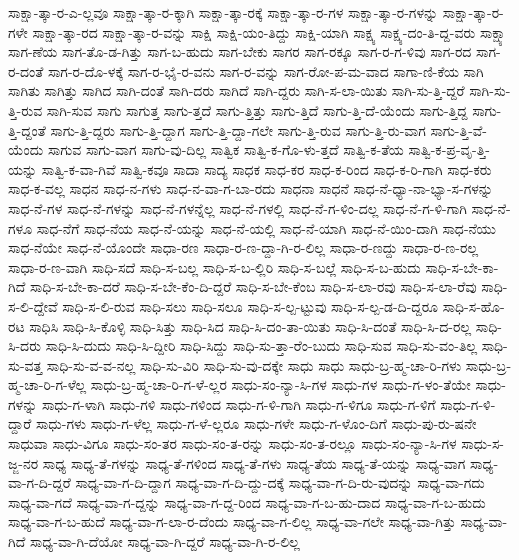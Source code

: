 {ಸಾಕ್ಷಾ-ತ್ಕಾ-ರ-ಎ-ಲ್ಲವೂ
ಸಾಕ್ಷಾ-ತ್ಕಾ-ರ-ಕ್ಕಾಗಿ
ಸಾಕ್ಷಾ-ತ್ಕಾ-ರಕ್ಕೆ
ಸಾಕ್ಷಾ-ತ್ಕಾ-ರ-ಗಳ
ಸಾಕ್ಷಾ-ತ್ಕಾ-ರ-ಗಳನ್ನು
ಸಾಕ್ಷಾ-ತ್ಕಾ-ರ-ಗಳೇ
ಸಾಕ್ಷಾ-ತ್ಕಾ-ರದ
ಸಾಕ್ಷಾ-ತ್ಕಾ-ರ-ವನ್ನು
ಸಾಕ್ಷಿ
ಸಾಕ್ಷಿ-ಯಂ-ತಿದ್ದು
ಸಾಕ್ಷಿ-ಯಾಗಿ
ಸಾಕ್ಷ್ಯ
ಸಾಕ್ಷ್ಯ-ದಂ-ತಿ-ದ್ದ-ವರು
ಸಾಕ್ಷ್ಯಾ
ಸಾಗ-ಣೆಯ
ಸಾಗ-ತೊ-ಡ-ಗಿತ್ತು
ಸಾಗ-ಬ-ಹುದು
ಸಾಗ-ಬೇಕು
ಸಾಗರ
ಸಾಗ-ರಕ್ಕೂ
ಸಾಗ-ರ-ಗ-ಳಿವು
ಸಾಗ-ರದ
ಸಾಗ-ರ-ದಂತೆ
ಸಾಗ-ರ-ದೊ-ಳಕ್ಕೆ
ಸಾಗ-ರ-ಭೈ-ರ-ವನು
ಸಾಗ-ರ-ವನ್ನು
ಸಾಗ-ರೋ-ಪ-ಮ-ವಾದ
ಸಾಗಾ-ಣಿ-ಕೆಯ
ಸಾಗಿ
ಸಾಗಿತು
ಸಾಗಿತ್ತು
ಸಾಗಿದ
ಸಾಗಿ-ದಂತೆ
ಸಾಗಿ-ದರು
ಸಾಗಿದೆ
ಸಾಗಿ-ದ್ದರು
ಸಾಗಿ-ಸ-ಲಾ-ಯಿತು
ಸಾಗಿ-ಸು-ತ್ತಿ-ದ್ದರೆ
ಸಾಗಿ-ಸು-ತ್ತಿ-ರುವ
ಸಾಗಿ-ಸುವ
ಸಾಗು
ಸಾಗುತ್ತ
ಸಾಗು-ತ್ತದೆ
ಸಾಗು-ತ್ತಿತ್ತು
ಸಾಗು-ತ್ತಿದೆ
ಸಾಗು-ತ್ತಿ-ದೆ-ಯೆಂದು
ಸಾಗು-ತ್ತಿದ್ದ
ಸಾಗು-ತ್ತಿ-ದ್ದಂತೆ
ಸಾಗು-ತ್ತಿ-ದ್ದರು
ಸಾಗು-ತ್ತಿ-ದ್ದಾಗ
ಸಾಗು-ತ್ತಿ-ದ್ದಾ-ಗಲೇ
ಸಾಗು-ತ್ತಿ-ರುವ
ಸಾಗು-ತ್ತಿ-ರು-ವಾಗ
ಸಾಗು-ತ್ತಿ-ವೆ-ಯೆಂದು
ಸಾಗುವ
ಸಾಗು-ವಾಗ
ಸಾಗು-ವು-ದಿಲ್ಲ
ಸಾತ್ವಿಕ
ಸಾತ್ವಿ-ಕ-ಗೊ-ಳು-ತ್ತದೆ
ಸಾತ್ವಿ-ಕ-ತೆಯ
ಸಾತ್ವಿ-ಕ-ಪ್ರ-ವೃ-ತ್ತಿ-ಯನ್ನು
ಸಾತ್ವಿ-ಕ-ವಾ-ಗಿವೆ
ಸಾತ್ವಿ-ಕವೂ
ಸಾದಾ
ಸಾದ್ಯ
ಸಾಧಕ
ಸಾಧ-ಕರ
ಸಾಧ-ಕ-ರಿಂದ
ಸಾಧ-ಕ-ರಿ-ಗಾಗಿ
ಸಾಧ-ಕರು
ಸಾಧ-ಕ-ವಲ್ಲ
ಸಾಧನ
ಸಾಧ-ನ-ಗಳು
ಸಾಧ-ನ-ವಾ-ಗ-ಬಾ-ರದು
ಸಾಧನಾ
ಸಾಧನೆ
ಸಾಧ-ನೆ-ಧ್ಯಾ-ನಾ-ಭ್ಯಾ-ಸ-ಗಳನ್ನು
ಸಾಧ-ನೆ-ಗಳ
ಸಾಧ-ನೆ-ಗಳನ್ನು
ಸಾಧ-ನೆ-ಗಳನ್ನೆಲ್ಲ
ಸಾಧ-ನೆ-ಗಳಲ್ಲಿ
ಸಾಧ-ನೆ-ಗ-ಳಿಂ-ದಲ್ಲ
ಸಾಧ-ನೆ-ಗ-ಳಿ-ಗಾಗಿ
ಸಾಧ-ನೆ-ಗಳೂ
ಸಾಧ-ನೆಗೆ
ಸಾಧ-ನೆಯ
ಸಾಧ-ನೆ-ಯನ್ನು
ಸಾಧ-ನೆ-ಯಲ್ಲಿ
ಸಾಧ-ನೆ-ಯಾಗಿ
ಸಾಧ-ನೆ-ಯಿಂ-ದಾಗಿ
ಸಾಧ-ನೆಯು
ಸಾಧ-ನೆಯೇ
ಸಾಧ-ನೆ-ಯೊಂದೇ
ಸಾಧಾ-ರಣ
ಸಾಧಾ-ರ-ಣ-ದ್ದಾ-ಗಿ-ರ-ಲಿಲ್ಲ
ಸಾಧಾ-ರ-ಣದ್ದು
ಸಾಧಾ-ರ-ಣ-ರಲ್ಲ
ಸಾಧಾ-ರ-ಣ-ವಾಗಿ
ಸಾಧಿ-ಸದೆ
ಸಾಧಿ-ಸ-ಬಲ್ಲ
ಸಾಧಿ-ಸ-ಬ-ಲ್ಲಿರಿ
ಸಾಧಿ-ಸ-ಬಲ್ಲೆ
ಸಾಧಿ-ಸ-ಬ-ಹುದು
ಸಾಧಿ-ಸ-ಬೇ-ಕಾ-ಗಿದೆ
ಸಾಧಿ-ಸ-ಬೇ-ಕಾ-ದರೆ
ಸಾಧಿ-ಸ-ಬೇ-ಕೆಂ-ದಿ-ದ್ದರೆ
ಸಾಧಿ-ಸ-ಬೇ-ಕೆಂಬ
ಸಾಧಿ-ಸ-ಲಾ-ರವು
ಸಾಧಿ-ಸ-ಲಾ-ರೆವು
ಸಾಧಿ-ಸ-ಲಿ-ದ್ದೇವೆ
ಸಾಧಿ-ಸ-ಲಿ-ರುವ
ಸಾಧಿ-ಸಲು
ಸಾಧಿ-ಸಲೂ
ಸಾಧಿ-ಸ-ಲ್ಪ-ಟ್ಟುವು
ಸಾಧಿ-ಸ-ಲ್ಪ-ಡ-ದಿ-ದ್ದರೂ
ಸಾಧಿ-ಸ-ಹೊ-ರಟ
ಸಾಧಿಸಿ
ಸಾಧಿ-ಸಿ-ಕೊಳ್ಳಿ
ಸಾಧಿ-ಸಿತ್ತು
ಸಾಧಿ-ಸಿದ
ಸಾಧಿ-ಸಿ-ದಂ-ತಾ-ಯಿತು
ಸಾಧಿ-ಸಿ-ದಂತೆ
ಸಾಧಿ-ಸಿ-ದ-ರಲ್ಲ
ಸಾಧಿ-ಸಿ-ದರು
ಸಾಧಿ-ಸಿ-ದುದು
ಸಾಧಿ-ಸಿ-ದ್ದೀರಿ
ಸಾಧಿ-ಸಿದ್ದು
ಸಾಧಿ-ಸು-ತ್ತಾ-ರೆಂ-ಬುದು
ಸಾಧಿ-ಸುವ
ಸಾಧಿ-ಸು-ವಂ-ತಿಲ್ಲ
ಸಾಧಿ-ಸು-ವತ್ತ
ಸಾಧಿ-ಸು-ವ-ವ-ನಲ್ಲ
ಸಾಧಿ-ಸು-ವಿರಿ
ಸಾಧಿ-ಸು-ವು-ದಕ್ಕೇ
ಸಾಧು
ಸಾಧು
ಸಾಧು-ಬ್ರ-ಹ್ಮ-ಚಾ-ರಿ-ಗಳು
ಸಾಧು-ಬ್ರ-ಹ್ಮ-ಚಾ-ರಿ-ಗ-ಳೆಲ್ಲ
ಸಾಧು-ಬ್ರ-ಹ್ಮ-ಚಾ-ರಿ-ಗ-ಳೆ-ಲ್ಲರ
ಸಾಧು-ಸಂ-ನ್ಯಾ-ಸಿ-ಗಳ
ಸಾಧು-ಗಳ
ಸಾಧು-ಗ-ಳಂ-ತೆಯೇ
ಸಾಧು-ಗಳನ್ನು
ಸಾಧು-ಗ-ಳಾಗಿ
ಸಾಧು-ಗಳಿ
ಸಾಧು-ಗಳಿಂದ
ಸಾಧು-ಗ-ಳಿ-ಗಾಗಿ
ಸಾಧು-ಗ-ಳಿಗೂ
ಸಾಧು-ಗ-ಳಿಗೆ
ಸಾಧು-ಗ-ಳಿ-ದ್ದಾರೆ
ಸಾಧು-ಗಳು
ಸಾಧು-ಗ-ಳೆಲ್ಲ
ಸಾಧು-ಗ-ಳೆ-ಲ್ಲರೂ
ಸಾಧು-ಗಳೇ
ಸಾಧು-ಗ-ಳೊಂ-ದಿಗೆ
ಸಾಧು-ಪು-ರು-ಷನೇ
ಸಾಧುವಾ
ಸಾಧು-ವಿಗೂ
ಸಾಧು-ಸಂ-ತರ
ಸಾಧು-ಸಂ-ತ-ರನ್ನು
ಸಾಧು-ಸಂ-ತ-ರಲ್ಲೂ
ಸಾಧು-ಸಂ-ನ್ಯಾ-ಸಿ-ಗಳ
ಸಾಧು-ಸ-ಜ್ಜ-ನರ
ಸಾಧ್ಯ
ಸಾಧ್ಯ-ತೆ-ಗಳನ್ನು
ಸಾಧ್ಯ-ತೆ-ಗಳಿಂದ
ಸಾಧ್ಯ-ತೆ-ಗಳು
ಸಾಧ್ಯ-ತೆಯ
ಸಾಧ್ಯ-ತೆ-ಯನ್ನು
ಸಾಧ್ಯ-ವಾಗ
ಸಾಧ್ಯ-ವಾ-ಗ-ದಿ-ದ್ದರೆ
ಸಾಧ್ಯ-ವಾ-ಗ-ದಿ-ದ್ದಾಗ
ಸಾಧ್ಯ-ವಾ-ಗ-ದಿ-ದ್ದು-ದಕ್ಕೆ
ಸಾಧ್ಯ-ವಾ-ಗ-ದಿ-ರು-ವುದನ್ನು
ಸಾಧ್ಯ-ವಾ-ಗದು
ಸಾಧ್ಯ-ವಾ-ಗದೆ
ಸಾಧ್ಯ-ವಾ-ಗ-ದ್ದನ್ನು
ಸಾಧ್ಯ-ವಾ-ಗ-ದ್ದ-ರಿಂದ
ಸಾಧ್ಯ-ವಾ-ಗ-ಬ-ಹು-ದಾದ
ಸಾಧ್ಯ-ವಾ-ಗ-ಬ-ಹುದು
ಸಾಧ್ಯ-ವಾ-ಗ-ಬ-ಹುದೆ
ಸಾಧ್ಯ-ವಾ-ಗ-ಲಾ-ರ-ದೆಂದು
ಸಾಧ್ಯ-ವಾ-ಗ-ಲಿಲ್ಲ
ಸಾಧ್ಯ-ವಾ-ಗಲೇ
ಸಾಧ್ಯ-ವಾ-ಗಿತ್ತು
ಸಾಧ್ಯ-ವಾ-ಗಿದೆ
ಸಾಧ್ಯ-ವಾ-ಗಿ-ದೆಯೋ
ಸಾಧ್ಯ-ವಾ-ಗಿ-ದ್ದರೆ
ಸಾಧ್ಯ-ವಾ-ಗಿ-ರ-ಲಿಲ್ಲ
}
